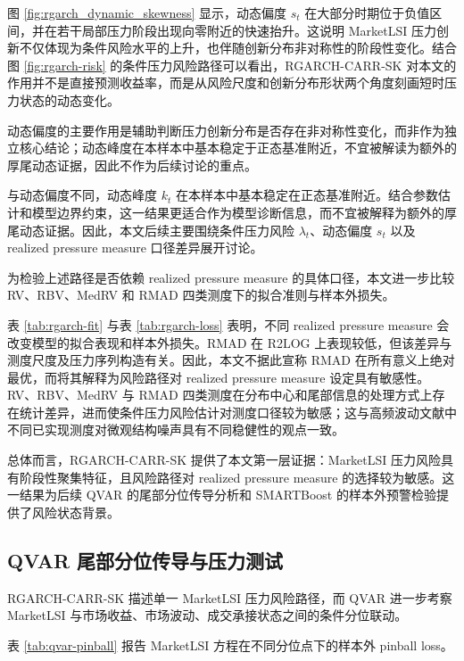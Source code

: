 图 \ref{fig:rgarch_dynamic_skewness} 显示，动态偏度 \(s_t\) 在大部分时期位于负值区间，并在若干局部压力阶段出现向零附近的快速抬升。这说明 MarketLSI 压力创新不仅体现为条件风险水平的上升，也伴随创新分布非对称性的阶段性变化。结合图 \ref{fig:rgarch-risk} 的条件压力风险路径可以看出，RGARCH-CARR-SK 对本文的作用并不是直接预测收益率，而是从风险尺度和创新分布形状两个角度刻画短时压力状态的动态变化。

动态偏度的主要作用是辅助判断压力创新分布是否存在非对称性变化，而非作为独立核心结论；动态峰度在本样本中基本稳定于正态基准附近，不宜被解读为额外的厚尾动态证据，因此不作为后续讨论的重点。

与动态偏度不同，动态峰度 \(k_t\) 在本样本中基本稳定在正态基准附近。结合参数估计和模型边界约束，这一结果更适合作为模型诊断信息，而不宜被解释为额外的厚尾动态证据。因此，本文后续主要围绕条件压力风险 \(\lambda_t\)、动态偏度 \(s_t\) 以及 realized pressure measure 口径差异展开讨论。

为检验上述路径是否依赖 realized pressure measure 的具体口径，本文进一步比较 RV、RBV、MedRV 和 RMAD 四类测度下的拟合准则与样本外损失。



表 \ref{tab:rgarch-fit} 与表 \ref{tab:rgarch-loss} 表明，不同 realized pressure measure 会改变模型的拟合表现和样本外损失。RMAD 在 R2LOG 上表现较低，但该差异与测度尺度及压力序列构造有关。因此，本文不据此宣称 RMAD 在所有意义上绝对最优，而将其解释为风险路径对 realized pressure measure 设定具有敏感性。RV、RBV、MedRV 与 RMAD 四类测度在分布中心和尾部信息的处理方式上存在统计差异，进而使条件压力风险估计对测度口径较为敏感；这与高频波动文献中不同已实现测度对微观结构噪声具有不同稳健性的观点一致。

总体而言，RGARCH-CARR-SK 提供了本文第一层证据：MarketLSI 压力风险具有阶段性聚集特征，且风险路径对 realized pressure measure 的选择较为敏感。这一结果为后续 QVAR 的尾部分位传导分析和 SMARTBoost 的样本外预警检验提供了风险状态背景。

\FloatBarrier

\subsection{QVAR 尾部分位传导与压力测试}

RGARCH-CARR-SK 描述单一 MarketLSI 压力风险路径，而 QVAR 进一步考察 MarketLSI 与市场收益、市场波动、成交承接状态之间的条件分位联动。

表 \ref{tab:qvar-pinball} 报告 MarketLSI 方程在不同分位点下的样本外 pinball loss。

